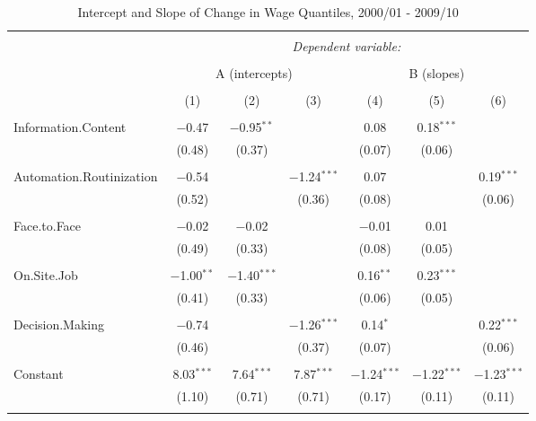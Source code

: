 \documentclass{article}
\begin{document}
\begin{table}[!htbp] \centering 
  \caption{Intercept and Slope of Change in Wage Quantiles, 2000/01 - 2009/10} 
  \label{} 
\begin{tabular}{@{\extracolsep{5pt}}lcccccc} 
\\[-1.8ex]\hline 
\hline \\[-1.8ex] 
 & \multicolumn{6}{c}{\textit{Dependent variable:}} \\ 
\cline{2-7} 
\\[-1.8ex] & \multicolumn{3}{c}{A (intercepts)} & \multicolumn{3}{c}{B (slopes)} \\ 
\\[-1.8ex] & (1) & (2) & (3) & (4) & (5) & (6)\\ 
\hline \\[-1.8ex] 
 Information.Content & $-$0.47 & $-$0.95$^{**}$ &  & 0.08 & 0.18$^{***}$ &  \\ 
  & (0.48) & (0.37) &  & (0.07) & (0.06) &  \\ 
  & & & & & & \\ 
 Automation.Routinization & $-$0.54 &  & $-$1.24$^{***}$ & 0.07 &  & 0.19$^{***}$ \\ 
  & (0.52) &  & (0.36) & (0.08) &  & (0.06) \\ 
  & & & & & & \\ 
 Face.to.Face & $-$0.02 & $-$0.02 &  & $-$0.01 & 0.01 &  \\ 
  & (0.49) & (0.33) &  & (0.08) & (0.05) &  \\ 
  & & & & & & \\ 
 On.Site.Job & $-$1.00$^{**}$ & $-$1.40$^{***}$ &  & 0.16$^{**}$ & 0.23$^{***}$ &  \\ 
  & (0.41) & (0.33) &  & (0.06) & (0.05) &  \\ 
  & & & & & & \\ 
 Decision.Making & $-$0.74 &  & $-$1.26$^{***}$ & 0.14$^{*}$ &  & 0.22$^{***}$ \\ 
  & (0.46) &  & (0.37) & (0.07) &  & (0.06) \\ 
  & & & & & & \\ 
 Constant & 8.03$^{***}$ & 7.64$^{***}$ & 7.87$^{***}$ & $-$1.24$^{***}$ & $-$1.22$^{***}$ & $-$1.23$^{***}$ \\ 
  & (1.10) & (0.71) & (0.71) & (0.17) & (0.11) & (0.11) \\ 
  & & & & & & \\ 

\end{tabular}
\end{table}
\end{document}
